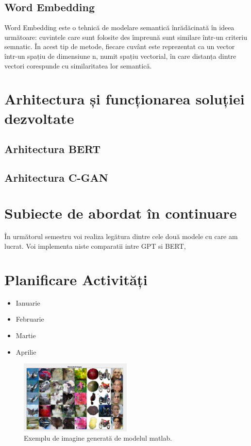 \documentclass[conference]{IEEEtran}
\begin{document}
\subsection{Word Embedding}
Word Embedding este o tehnică de modelare semantică înrădăcinată în ideea următoare:
cuvintele care sunt folosite des împreună sunt similare într-un criteriu semnatic.
În acest tip de metode, fiecare cuvânt este reprezentat ca un vector într-un spațiu de dimensiune n,
numit spațiu vectorial, în care distanța dintre vectori corespunde cu similaritatea lor semantică.





\section{Arhitectura și funcționarea soluției dezvoltate}

\subsection{Arhitectura BERT}

\subsection{Arhitectura C-GAN}




\section{Subiecte de abordat în continuare}
În următorul semestru voi realiza legătura dintre cele două modele cu care am lucrat.
Voi implementa niste comparatii intre GPT si BERT, 

\section{Planificare Activități}
\begin{itemize}
	\item Ianuarie 
	\item Februarie
	\item Martie
	\item Aprilie
\end{itemize}



\begin{figure}[htbp]
\centerline{\includegraphics[width=0.5\textwidth]{fig1.png}}
\caption{Exemplu de imagine generată de modelul matlab.}
\label{fig}
\end{figure}


\nocite{*}



\end{document}
